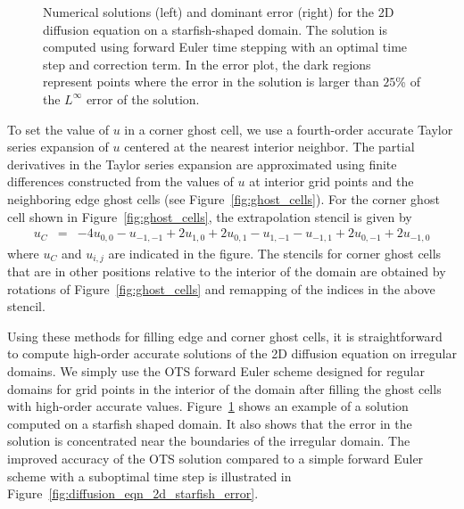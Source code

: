 \documentclass[fleqn,12pt,twoside]{article}
\newcommand{\bea}{\begin{eqnarray}}
\newcommand{\eea}{\end{eqnarray}}
\begin{document}
\begin{figure}[tb]
\begin{center}
\caption{Numerical solutions (left) and dominant error (right) for the 2D 
diffusion equation on a starfish-shaped domain.  The solution is computed 
using forward Euler time stepping with an optimal time step and correction 
term.  In the error plot, the dark regions represent points 
where the error in the solution is larger than $25$\% of the $L^\infty$ error 
of the solution.  
}
\label{fig:diffusion_eqn_2d_starfish_domain}
\end{center}
\end{figure}

To set the value of $u$ in a corner ghost cell, we use a fourth-order accurate
Taylor series expansion of $u$ centered at the nearest interior 
neighbor.  The partial derivatives in the Taylor series expansion are 
approximated using finite differences constructed from the values of $u$ 
at interior grid points and the neighboring edge ghost cells (see 
Figure~\ref{fig:ghost_cells}).  For the corner ghost cell shown 
in Figure~\ref{fig:ghost_cells}, the extrapolation stencil is given by
\bea
  u_C &=&  -4 u_{0,0} - u_{-1,-1} + 2 u_{1,0} + 2 u_{0,1}
      - u_{1,-1} - u_{-1,1} + 2 u_{0,-1} + 2 u_{-1,0}
\eea
where $u_C$ and $u_{i,j}$ are indicated in the figure.  The stencils for
corner ghost cells that are in other positions relative to the interior of 
the domain are obtained by rotations of Figure~\ref{fig:ghost_cells} and 
remapping of the indices in the above stencil.

Using these methods for filling edge and corner ghost cells, it is 
straightforward to compute high-order accurate solutions of the 2D diffusion 
equation on irregular domains.  We simply use the OTS forward Euler scheme 
designed for regular domains for grid points in the interior of the domain
after filling the ghost cells with high-order accurate values.  
Figure~\ref{fig:diffusion_eqn_2d_starfish_domain} shows an example of 
a solution computed on a starfish shaped domain.  It also shows that the 
error in the solution is concentrated near the boundaries of the irregular
domain.  The improved accuracy of the OTS solution compared to a simple 
forward Euler scheme with a suboptimal time step is illustrated in 
Figure~\ref{fig:diffusion_eqn_2d_starfish_error}. 
\end{document}
